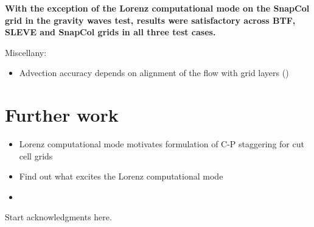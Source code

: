 \documentclass[twocol]{ametsoc}
\begin{document}
\textbf{With the exception of the Lorenz computational mode on the SnapCol grid in the gravity waves test, results were satisfactory across BTF, SLEVE and SnapCol grids in all three test cases.}

Miscellany:
\begin{itemize}
	\item Advection accuracy depends on alignment of the flow with grid layers ()
\end{itemize}

\section{Further work}
\begin{itemize}
	\item Lorenz computational mode motivates formulation of C-P staggering for cut cell grids
	\item Find out what excites the Lorenz computational mode
	\item {}
\end{itemize}

\acknowledgments
Start acknowledgments here.







\end{document}
